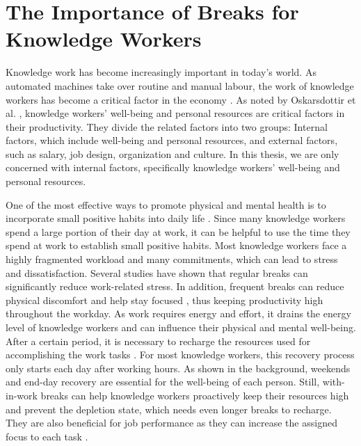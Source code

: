 \documentclass{hasel_thesis}
\begin{document}
\section{The Importance of Breaks for Knowledge Workers}
\begin{comment} 
Preventive breaks can help to reduce phisical disconfort, but most of the time knowledge worker only take breaks when it is alreaddy to late. cite Frequent short breaks...

Also add something to work cultur
\end{comment}

Knowledge work has become increasingly important in today's world. As automated machines take over routine and manual labour, the work of knowledge workers has become a critical factor in the economy \cite{Oskarsdottir.2022}. As noted by Oskarsdottir et al. \cite{Oskarsdottir.2022}, knowledge workers' well-being and personal resources are critical factors in their productivity. They divide the related factors into two groups: Internal factors, which include well-being and personal resources, and external factors, such as salary, job design, organization and culture.
In this thesis, we are only concerned with internal factors, specifically knowledge workers' well-being and personal resources.

One of the most effective ways to promote physical and mental health is to incorporate small positive habits into daily life \cite{Taylor.2005}. Since many knowledge workers spend a large portion of their day at work, it can be helpful to use the time they spend at work to establish small positive habits. Most knowledge workers face a highly fragmented workload and many commitments, which can lead to stress and dissatisfaction. Several studies \cite{Largo-Wight.2017, KimS.ParkY.&Niu.2017} have shown that regular breaks can significantly reduce work-related stress. In addition, frequent breaks can reduce physical discomfort \cite{Waongenngarm.2018} and help stay focused \cite{Packer.2021}, thus keeping productivity high throughout the workday.
As work requires energy and effort, it drains the energy level of knowledge workers and can influence their physical and mental well-being. After a certain period, it is necessary to recharge the resources used for accomplishing the work tasks \cite{Sonnentag.2006}. For most knowledge workers, this recovery process only starts each day after working hours. As shown in the background, weekends and end-day recovery are essential for the well-being of each person. Still, with-in-work breaks can help knowledge workers proactively keep their resources high and prevent the depletion state, which needs even longer breaks to recharge. They are also beneficial for job performance as they can increase the assigned focus to each task \cite{Trougakos.2009}. 
\end{document}
